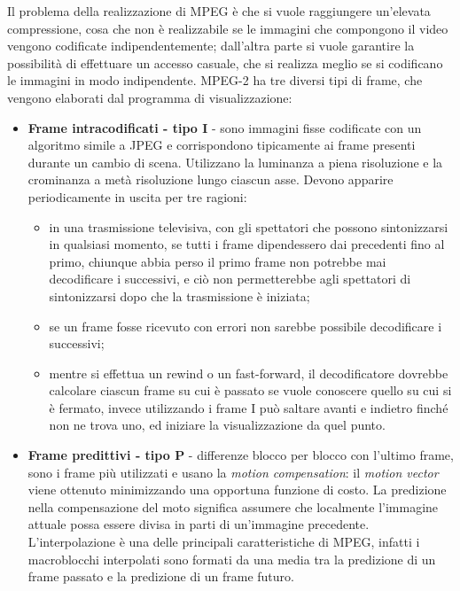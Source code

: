 Il problema della realizzazione di MPEG è che si vuole raggiungere un'elevata compressione, cosa che non è realizzabile se le immagini che compongono il video vengono codificate indipendentemente; dall'altra parte si vuole garantire la possibilità di effettuare un accesso casuale, che si realizza meglio se si codificano le immagini in modo indipendente. MPEG-2 ha tre diversi tipi di frame, che vengono elaborati dal programma di visualizzazione:
\begin{itemize}
    \item \textbf{Frame intracodificati - tipo I} - sono immagini fisse codificate con un algoritmo simile a JPEG e corrispondono tipicamente ai frame presenti durante un cambio di scena. Utilizzano la luminanza a piena risoluzione e la crominanza a metà risoluzione lungo ciascun asse. Devono apparire periodicamente in uscita per tre ragioni:
    \begin{itemize}
        \item in una trasmissione televisiva, con gli spettatori che possono sintonizzarsi in qualsiasi momento, se tutti i frame dipendessero dai precedenti fino al primo, chiunque abbia perso il primo frame non potrebbe mai decodificare i successivi, e ciò non permetterebbe agli spettatori di sintonizzarsi dopo che la trasmissione è iniziata;
        \item se un frame fosse ricevuto con errori non sarebbe possibile decodificare i successivi;
        \item mentre si effettua un rewind o un fast-forward, il decodificatore dovrebbe calcolare ciascun frame su cui è passato se vuole conoscere quello su cui si è fermato, invece utilizzando i frame I può saltare avanti e indietro finché non ne trova uno, ed iniziare la visualizzazione da quel punto.
    \end{itemize}
    \item \textbf{Frame predittivi - tipo P} - differenze blocco per blocco con l'ultimo frame, sono i frame più utilizzati e usano la \textit{motion compensation}: il \textit{motion vector} viene ottenuto minimizzando una opportuna funzione di costo. La predizione nella compensazione del moto significa assumere che localmente l'immagine attuale possa essere divisa in parti di un'immagine precedente. L'interpolazione è una delle principali caratteristiche di MPEG, infatti i macroblocchi interpolati sono formati da una media tra la predizione di un frame passato e la predizione di un frame futuro.
    
    \begin{figure}[htbp!]
        \centering
        
    \end{figure}
    \FloatBarrier
    

\end{itemize}
